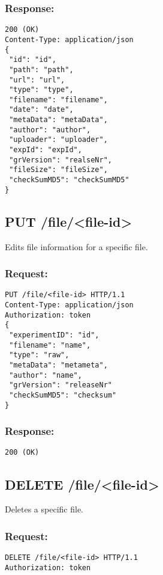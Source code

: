 \subsubsection*{Response:}
\begin{verbatim}
200 (OK)
Content-Type: application/json
{ 
 "id": "id",
 "path": "path",
 "url": "url",
 "type": "type",
 "filename": "filename",
 "date": "date",
 "metaData": "metaData",
 "author": "author",
 "uploader": "uploader",
 "expId": "expId",
 "grVersion": "realseNr",
 "fileSize": "fileSize",
 "checkSumMD5": "checkSumMD5"
}
\end{verbatim}

\subsection*{PUT /file/<file-id>}

Edits file information for a specific file.

\subsubsection*{Request:}
\begin{verbatim}
PUT /file/<file-id> HTTP/1.1
Content-Type: application/json
Authorization: token
{ 
 "experimentID": "id",
 "filename": "name",
 "type": "raw",
 "metaData": "metameta",
 "author": "name",
 "grVersion": "releaseNr"
 "checkSumMD5": "checksum"
}
\end{verbatim}

\subsubsection*{Response:}
\begin{verbatim}
200 (OK)
\end{verbatim}

\subsection*{DELETE /file/<file-id>}

Deletes a specific file.

\subsubsection*{Request:}
\begin{verbatim}
DELETE /file/<file-id> HTTP/1.1
Authorization: token
\end{verbatim}

